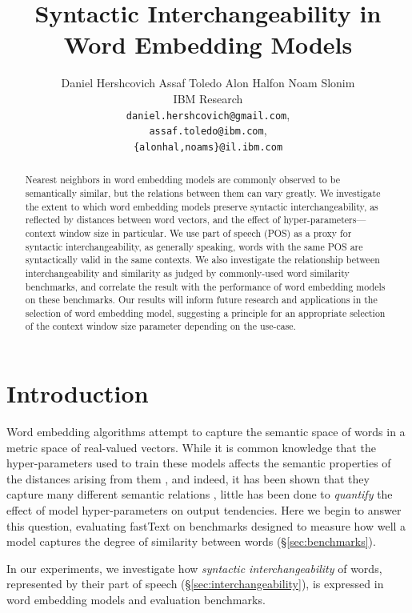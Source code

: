 \documentclass[11pt,a4paper]{article}
\title{Syntactic Interchangeability in Word Embedding Models}
\author{
Daniel Hershcovich \qquad Assaf Toledo \qquad Alon Halfon \qquad Noam Slonim \\
IBM Research\\
\texttt{daniel.hershcovich@gmail.com},\\
\texttt{assaf.toledo@ibm.com},\\
\texttt{\{alonhal,noams\}@il.ibm.com}
}
\begin{document}
    \maketitle

    \begin{abstract}
    Nearest neighbors in word embedding models are commonly observed to be
    semantically similar, but the relations between them can vary greatly.
    We investigate the extent to which word embedding models
    preserve syntactic interchangeability, as reflected by distances between
    word vectors, and the effect of hyper-parameters---context window size in particular.
    We use part of speech (POS) as a proxy for syntactic interchangeability,
    as generally speaking, words with the same POS are syntactically valid in the same contexts.
    We also investigate the relationship between interchangeability
    and similarity as judged by commonly-used word similarity benchmarks,
    and correlate the result with the performance of word embedding models
    on these benchmarks.
    Our results will inform future research and applications in the selection
    of word embedding model, suggesting a principle for an appropriate selection
    of the context window size parameter depending on the use-case.
    \end{abstract}

    \section{Introduction}\label{sec:introduction}

    Word embedding algorithms \cite{mikolov2013efficient,pennington2014glove,levy2015improving}
    attempt to capture the semantic space of words
    in a metric space of real-valued vectors.
    While it is common knowledge that the hyper-parameters used to train these
    models affects the semantic properties of the distances arising from them
    \cite{bansal2014tailoring,lin2015unsupervised,goldberg2016primer,W17-0239},
    and indeed, it has been shown that
    they capture many different semantic relations \cite{yang2006verb,agirre2009study},
    little has been done to \textit{quantify} the
    effect of model hyper-parameters on output tendencies.
    Here we begin to answer this question,
    evaluating fastText \cite{bojanowski2016enriching}
    on benchmarks designed to measure how well a model
    captures the degree of similarity between words (\S\ref{sec:benchmarks}).
    
    In our experiments, we investigate how
    \textit{syntactic interchangeability} of words,
    represented by their part of speech (\S\ref{sec:interchangeability}),
    is expressed in word embedding models and evaluation benchmarks.
    
\end{document}
